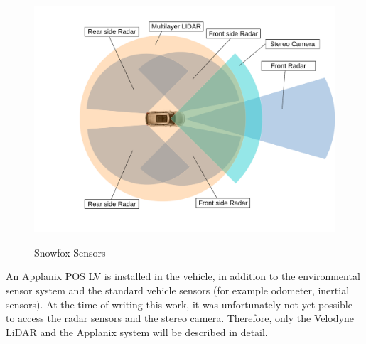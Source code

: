 \begin{figure}[!ht]
\caption{Snowfox Sensors}
\includegraphics[width=\columnwidth]{sensors.pdf}
\label{platform}
\end{figure}

An Applanix POS LV is installed in the vehicle, in addition to the environmental sensor system and the standard vehicle sensors (for example odometer, inertial sensors).
At the time of writing this work, it was unfortunately not yet possible to access the radar sensors and the stereo camera.
Therefore, only the Velodyne LiDAR and the Applanix system will be described in detail.

